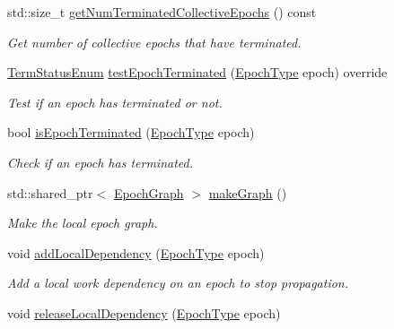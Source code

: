 \begin{DoxyCompactItemize}
std\+::size\+\_\+t \hyperlink{structvt_1_1term_1_1_termination_detector_af0b08c4a5dd17d893e677ad280bef84a}{get\+Num\+Terminated\+Collective\+Epochs} () const
\begin{DoxyCompactList}\small\item\em Get number of collective epochs that have terminated. \end{DoxyCompactList}\item 
\hyperlink{namespacevt_1_1term_ad8ec9b371608fc88e7fdeef219785b27}{Term\+Status\+Enum} \hyperlink{structvt_1_1term_1_1_termination_detector_a1d3cebd2600b5a3900dd9954de55cf35}{test\+Epoch\+Terminated} (\hyperlink{namespacevt_a81d11b28122d43bf9834577e4a06440f}{Epoch\+Type} epoch) override
\begin{DoxyCompactList}\small\item\em Test if an epoch has terminated or not. \end{DoxyCompactList}\item 
bool \hyperlink{structvt_1_1term_1_1_termination_detector_a2c85d1d5316235e068433f4a3984a67e}{is\+Epoch\+Terminated} (\hyperlink{namespacevt_a81d11b28122d43bf9834577e4a06440f}{Epoch\+Type} epoch)
\begin{DoxyCompactList}\small\item\em Check if an epoch has terminated. \end{DoxyCompactList}\item 
std\+::shared\+\_\+ptr$<$ \hyperlink{structvt_1_1term_1_1_termination_detector_af67f0ab522e54eb06d8ac541526155e3}{Epoch\+Graph} $>$ \hyperlink{structvt_1_1term_1_1_termination_detector_adb20ee8033c61f520d50592dd33b3080}{make\+Graph} ()
\begin{DoxyCompactList}\small\item\em Make the local epoch graph. \end{DoxyCompactList}\item 
void \hyperlink{structvt_1_1term_1_1_termination_detector_a6624f4c21fd145f5f8d4dc3cb792e5da}{add\+Local\+Dependency} (\hyperlink{namespacevt_a81d11b28122d43bf9834577e4a06440f}{Epoch\+Type} epoch)
\begin{DoxyCompactList}\small\item\em Add a local work dependency on an epoch to stop propagation. \end{DoxyCompactList}\item 
void \hyperlink{structvt_1_1term_1_1_termination_detector_ad00ee5e13c7832e1803238c746ee0fd4}{release\+Local\+Dependency} (\hyperlink{namespacevt_a81d11b28122d43bf9834577e4a06440f}{Epoch\+Type} epoch)

\end{DoxyCompactItemize}
